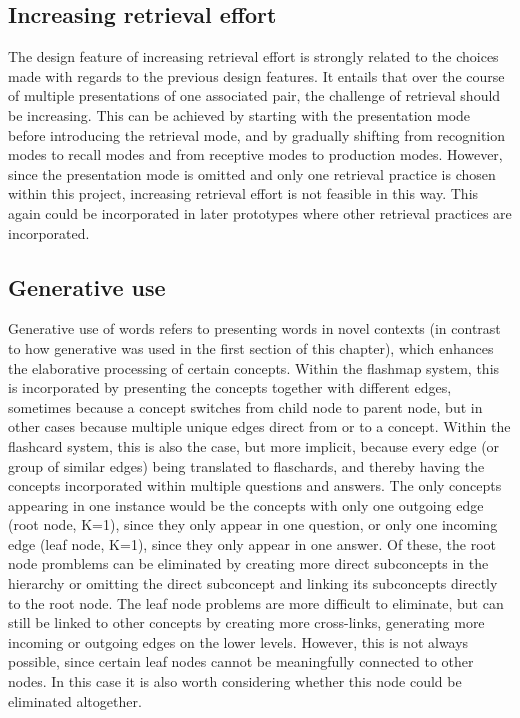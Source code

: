         \subsection{Increasing retrieval effort}

The design feature of increasing retrieval effort is strongly related to the choices made with regards to the previous design features. It entails that over the course of multiple presentations of one associated pair, the challenge of retrieval should be increasing. This can be achieved by starting with the presentation mode before introducing the retrieval mode, and by gradually shifting from recognition modes to recall modes and from receptive modes to production modes. However, since the presentation mode is omitted and only one retrieval practice is chosen within this project, increasing retrieval effort is not feasible in this way. This again could be incorporated in later prototypes where other retrieval practices are incorporated.

        \subsection{Generative use}

Generative use of words refers to presenting words in novel contexts (in contrast to how generative was used in the first section of this chapter), which enhances the elaborative processing of certain concepts. Within the flashmap system, this is incorporated by presenting the concepts together with different edges, sometimes because a concept switches from child node to parent node, but in other cases because multiple unique edges direct from or to a concept. Within the flashcard system, this is also the case, but more implicit, because every edge (or group of similar edges) being translated to flaschards, and thereby having the concepts incorporated within multiple questions and answers. The only concepts appearing in one instance would be the concepts with only one outgoing edge (root node, K=1), since they only appear in one question, or only one incoming edge (leaf node, K=1), since they only appear in one answer. Of these, the root node promblems can be eliminated by creating more direct subconcepts in the hierarchy or omitting the direct subconcept and linking its subconcepts directly to the root node. The leaf node problems are more difficult to eliminate, but can still be linked to other concepts by creating more cross-links, generating more incoming or outgoing edges on the lower levels. However, this is not always possible, since certain leaf nodes cannot be meaningfully connected to other nodes. In this case it is also worth considering whether this node could be eliminated altogether.

